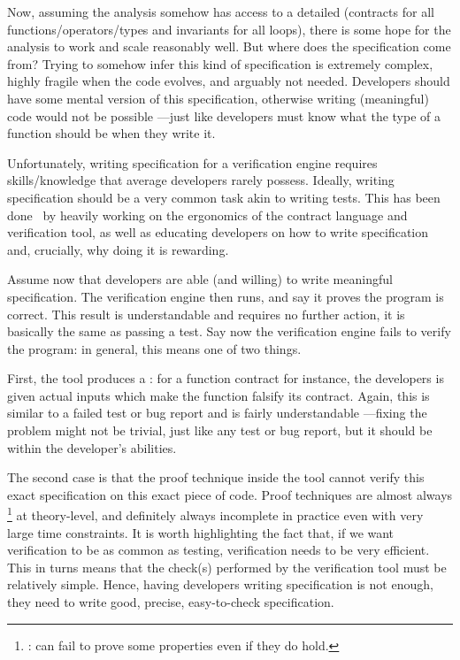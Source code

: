 \smallskip{}

Now, assuming the analysis somehow has access to a detailed  (contracts for all
functions/operators/types and invariants for all loops), there is some hope for the analysis to
work and scale reasonably well. But where does the specification come from? Trying to somehow infer
this kind of specification is extremely complex, highly fragile when the code evolves, and arguably
not needed. Developers should have some mental version of this specification, otherwise writing
(meaningful) code would not be possible ---just like developers must know what the type of a
function should be when they write it.

Unfortunately, writing specification for a verification engine requires skills/knowledge that
average developers rarely possess. Ideally, writing specification should be a very common task akin
to writing tests. This has been done~\cite{aws} by heavily working on the ergonomics of the
contract language and verification tool, as well as educating developers on how to write
specification and, crucially, why doing it is rewarding.

\smallskip{}

Assume now that developers are able (and willing) to write meaningful specification. The
verification engine then runs, and say it proves the program is correct. This result is
understandable and requires no further action, it is basically the same as passing a test. Say now
the verification engine fails to verify the program: in general, this means one of two things.

First, the tool produces a : for a function contract for instance, the
developers is given actual inputs which make the function falsify its contract. Again, this is
similar to a failed test or bug report and is fairly understandable ---fixing the problem might not
be trivial, just like any test or bug report, but it should be within the developer's abilities.

The second case is that the proof technique inside the tool cannot verify this exact specification
on this exact piece of code. Proof techniques are almost always %
\footnote{%
    : can fail to prove some properties even if they do hold.%
}
%
at theory-level, and definitely always incomplete in practice even with very large time
constraints. It is worth highlighting the fact that, if we want verification to be as common as
testing, verification needs to be very efficient. This in turns means that the check(s) performed
by the verification tool must be relatively simple. Hence, having developers writing specification
is not enough, they need to write good, precise, easy-to-check specification.

